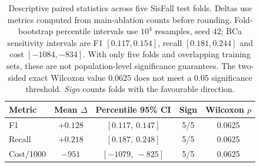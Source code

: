 \begin{table}[!t]
\centering
\caption{Descriptive paired statistics across five SisFall test folds. Deltas use metrics computed from main-ablation counts before rounding. Fold-bootstrap percentile intervals use $10^4$ resamples, seed $42$; BCa sensitivity intervals are F1 $[0.117,0.154]$, recall $[0.181,0.244]$ and cost $[-1084,-834]$. With only five folds and overlapping training sets, these are not population-level significance guarantees. The two-sided exact Wilcoxon value $0.0625$ does not meet a $0.05$ significance threshold. \emph{Sign} counts folds with the favourable direction.}
\label{tab:stats}
\begin{tabular}{lcccc}
\toprule
Metric & Mean $\Delta$ & Percentile 95\% CI & Sign & Wilcoxon $p$ \\
\midrule
F1         & $+0.128$ & $[0.117,\ 0.147]$ & 5/5 & 0.0625 \\
Recall     & $+0.218$ & $[0.187,\ 0.248]$ & 5/5 & 0.0625 \\
Cost/1000  & $-951$   & $[-1079,\ -825]$  & 5/5 & 0.0625 \\
\bottomrule
\end{tabular}
\end{table}

